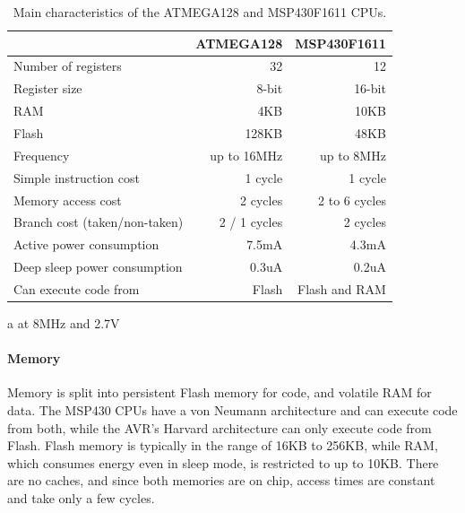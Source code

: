 \begin{table}
\caption{Main characteristics of the ATMEGA128 and MSP430F1611 CPUs.}
\label{tbl-atmega128-msp430f1611}
    \begin{threeparttable}
    \begin{tabular}{lrr}
    \toprule
                                           & ATMEGA128 \cite{Atmel:ATMEGA128Datasheet, Atmel:AVRInstructionSetManual}   & MSP430F1611 \cite{TexasInstrumentsIncorporated:MSP430F1611Datasheet, TexasInstrumentsIncorporated:MSP430x1xxUsersGuide} \\
    \midrule
    \midrule
    Number of registers                    & 32           & 12            \\
    Register size                          & 8-bit        & 16-bit        \\
    RAM                                    & 4KB          & 10KB          \\
    Flash                                  & 128KB        & 48KB          \\
    Frequency                              & up to 16MHz  & up to 8MHz    \\
    Simple instruction cost                & 1 cycle      & 1 cycle       \\
    Memory access cost                     & 2 cycles     & 2 to 6 cycles \\
    Branch cost (taken/non-taken)          & 2 / 1 cycles & 2 cycles      \\
    Active power consumption\tnote{a}      & 7.5mA        & 4.3mA         \\ %
    Deep sleep power consumption           & 0.3uA        & 0.2uA         \\
    Can execute code from                  & Flash        & Flash and RAM \\
    \bottomrule
    \end{tabular}
    \begin{tablenotes}
        \item[a] at 8MHz and 2.7V
    \end{tablenotes}
    \end{threeparttable}
\end{table}

\paragraph{Memory}
Memory is split into persistent Flash memory for code, and volatile RAM for data. The MSP430 CPUs have a von Neumann architecture and can execute code from both, while the AVR's Harvard architecture can only execute code from Flash. Flash memory is typically in the range of 16KB to 256KB, while RAM, which consumes energy even in sleep mode, is restricted to up to 10KB. There are no caches, and since both memories are on chip, access times are constant and take only a few cycles.


